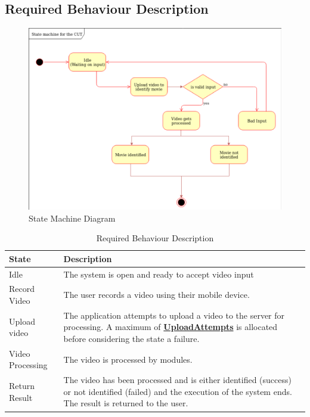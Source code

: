 \documentclass[titlepage]{article}
\begin{document}
\subsection{Required Behaviour Description}
\begin{figure}[H]
    \centering
    \includegraphics[width = 15cm]{img/SystemRequirement/stateMachine.png}
    \caption{State Machine Diagram}
    \label{fig:State_Machine}
\end{figure}
\begin{table}[h!]
    \centering
    \begin{tabularx}{\textwidth}{|l|X|}
    \hline
    \textbf {State}  & \textbf {Description} \\
    \hline
    Idle & The system is open and ready to accept video input\\
    \hline
    Record Video & The user records a video using their mobile device.\\
    \hline
    Upload video & The application attempts to upload a video to the server for processing. A maximum of \hyperref[tab:Variables]{\textbf{UploadAttempts}} is allocated before considering the state a failure.\\
    \hline
    Video Processing & The video is processed by modules.\\
    \hline
    Return Result & The video has been processed and is either identified (success) or not identified (failed) and the execution of the system ends. The result is returned to the user.\\
    \hline
    \end{tabularx}
    \caption{Required Behaviour Description}
    \label{tab:States}
\end{table}
\end{document}
